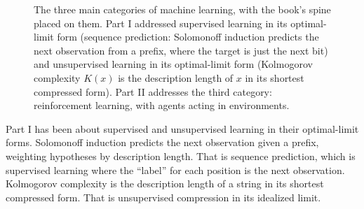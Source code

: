 \begin{figure}[h]
\centering
{}
\caption{The three main categories of machine learning, with the book's spine placed on them. Part I addressed supervised learning in its optimal-limit form (sequence prediction: Solomonoff induction predicts the next observation from a prefix, where the target is just the next bit) and unsupervised learning in its optimal-limit form (Kolmogorov complexity $K(x)$ is the description length of $x$ in its shortest compressed form). Part II addresses the third category: reinforcement learning, with agents acting in environments.}
\label{fig:trichotomy}
\end{figure}

Part I has been about supervised and unsupervised learning in their optimal-limit forms. Solomonoff induction predicts the next observation given a prefix, weighting hypotheses by description length. That is sequence prediction, which is supervised learning where the ``label'' for each position is the next observation. Kolmogorov complexity is the description length of a string in its shortest compressed form. That is unsupervised compression in its idealized limit.

